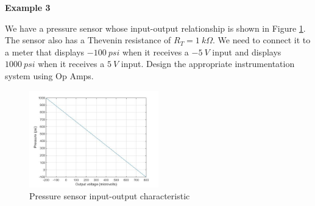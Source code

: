 \documentclass{handout}
\begin{document}
\newpage
\clearpage
\pagebreak

\textbf{Example 3}

We have a pressure sensor whose input-output relationship is shown in Figure \ref{fig: Example3Graph}.  The sensor also has a Thevenin resistance of $R_T = 1\ k\Omega$.  We need to connect it to a meter that displays $-100\ psi$ when it receives a $-5\ V$ input and displays $1000\ psi$ when it receives a $5\ V$ input.  Design the appropriate instrumentation system using Op Amps.
\begin{figure} [h!]
\centering
\includegraphics[width=0.5\textwidth]{Example3Graph.jpg}
\caption{Pressure sensor input-output characteristic}
\label{fig: Example3Graph}
\end{figure}


\newpage
\clearpage
\pagebreak
\end{document}

